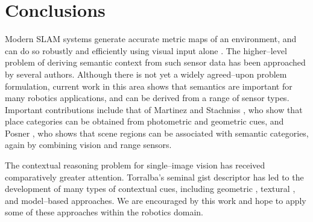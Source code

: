 \section{Conclusions}
Modern SLAM systems generate accurate metric maps of an environment,
and can do so robustly and efficiently using visual input alone
\cite{Klein07}. The higher--level problem of deriving semantic context
from such sensor data has been approached by several authors. Although
there is not yet a widely agreed--upon problem formulation, current
work in this area shows that semantics are important for many robotics
applications, and can be derived from a range of sensor
types. Important contributions include that of Martinez \cite{Mozos05}
and Stachniss \cite{Stachniss05}, who show that place categories can
be obtained from photometric and geometric cues, and Posner
\cite{Posner08}, who shows that scene regions can be associated with
semantic categories, again by combining vision and range sensors.

The contextual reasoning problem for single--image vision has received
comparatively greater attention. Torralba's seminal gist descriptor
\cite{Torralba03} has led to the development of many types of
contextual cues, including geometric \cite{Hoiem05,Saxena09}, textural
\cite{Heitz08}, and model--based \cite{Lee09} approaches. We are
encouraged by this work and hope to apply some of these approaches
within the robotics domain.
